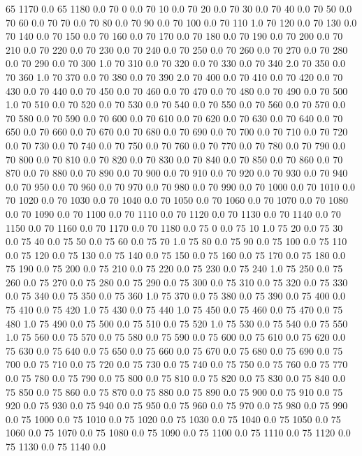 65	1170	0.0
65	1180	0.0
70	0	0.0
70	10	0.0
70	20	0.0
70	30	0.0
70	40	0.0
70	50	0.0
70	60	0.0
70	70	0.0
70	80	0.0
70	90	0.0
70	100	0.0
70	110	1.0
70	120	0.0
70	130	0.0
70	140	0.0
70	150	0.0
70	160	0.0
70	170	0.0
70	180	0.0
70	190	0.0
70	200	0.0
70	210	0.0
70	220	0.0
70	230	0.0
70	240	0.0
70	250	0.0
70	260	0.0
70	270	0.0
70	280	0.0
70	290	0.0
70	300	1.0
70	310	0.0
70	320	0.0
70	330	0.0
70	340	2.0
70	350	0.0
70	360	1.0
70	370	0.0
70	380	0.0
70	390	2.0
70	400	0.0
70	410	0.0
70	420	0.0
70	430	0.0
70	440	0.0
70	450	0.0
70	460	0.0
70	470	0.0
70	480	0.0
70	490	0.0
70	500	1.0
70	510	0.0
70	520	0.0
70	530	0.0
70	540	0.0
70	550	0.0
70	560	0.0
70	570	0.0
70	580	0.0
70	590	0.0
70	600	0.0
70	610	0.0
70	620	0.0
70	630	0.0
70	640	0.0
70	650	0.0
70	660	0.0
70	670	0.0
70	680	0.0
70	690	0.0
70	700	0.0
70	710	0.0
70	720	0.0
70	730	0.0
70	740	0.0
70	750	0.0
70	760	0.0
70	770	0.0
70	780	0.0
70	790	0.0
70	800	0.0
70	810	0.0
70	820	0.0
70	830	0.0
70	840	0.0
70	850	0.0
70	860	0.0
70	870	0.0
70	880	0.0
70	890	0.0
70	900	0.0
70	910	0.0
70	920	0.0
70	930	0.0
70	940	0.0
70	950	0.0
70	960	0.0
70	970	0.0
70	980	0.0
70	990	0.0
70	1000	0.0
70	1010	0.0
70	1020	0.0
70	1030	0.0
70	1040	0.0
70	1050	0.0
70	1060	0.0
70	1070	0.0
70	1080	0.0
70	1090	0.0
70	1100	0.0
70	1110	0.0
70	1120	0.0
70	1130	0.0
70	1140	0.0
70	1150	0.0
70	1160	0.0
70	1170	0.0
70	1180	0.0
75	0	0.0
75	10	1.0
75	20	0.0
75	30	0.0
75	40	0.0
75	50	0.0
75	60	0.0
75	70	1.0
75	80	0.0
75	90	0.0
75	100	0.0
75	110	0.0
75	120	0.0
75	130	0.0
75	140	0.0
75	150	0.0
75	160	0.0
75	170	0.0
75	180	0.0
75	190	0.0
75	200	0.0
75	210	0.0
75	220	0.0
75	230	0.0
75	240	1.0
75	250	0.0
75	260	0.0
75	270	0.0
75	280	0.0
75	290	0.0
75	300	0.0
75	310	0.0
75	320	0.0
75	330	0.0
75	340	0.0
75	350	0.0
75	360	1.0
75	370	0.0
75	380	0.0
75	390	0.0
75	400	0.0
75	410	0.0
75	420	1.0
75	430	0.0
75	440	1.0
75	450	0.0
75	460	0.0
75	470	0.0
75	480	1.0
75	490	0.0
75	500	0.0
75	510	0.0
75	520	1.0
75	530	0.0
75	540	0.0
75	550	1.0
75	560	0.0
75	570	0.0
75	580	0.0
75	590	0.0
75	600	0.0
75	610	0.0
75	620	0.0
75	630	0.0
75	640	0.0
75	650	0.0
75	660	0.0
75	670	0.0
75	680	0.0
75	690	0.0
75	700	0.0
75	710	0.0
75	720	0.0
75	730	0.0
75	740	0.0
75	750	0.0
75	760	0.0
75	770	0.0
75	780	0.0
75	790	0.0
75	800	0.0
75	810	0.0
75	820	0.0
75	830	0.0
75	840	0.0
75	850	0.0
75	860	0.0
75	870	0.0
75	880	0.0
75	890	0.0
75	900	0.0
75	910	0.0
75	920	0.0
75	930	0.0
75	940	0.0
75	950	0.0
75	960	0.0
75	970	0.0
75	980	0.0
75	990	0.0
75	1000	0.0
75	1010	0.0
75	1020	0.0
75	1030	0.0
75	1040	0.0
75	1050	0.0
75	1060	0.0
75	1070	0.0
75	1080	0.0
75	1090	0.0
75	1100	0.0
75	1110	0.0
75	1120	0.0
75	1130	0.0
75	1140	0.0

